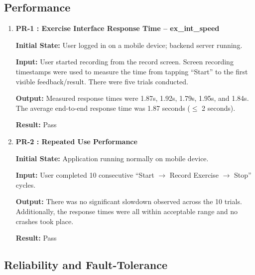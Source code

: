 \documentclass[12pt, titlepage]{article}
\begin{document}
\subsection{Performance}

\begin{enumerate}

\item \textbf{PR-1 : Exercise Interface Response Time -- ex\_int\_speed}

\textbf{Initial State:} User logged in on a mobile device; backend server running.

\textbf{Input:} User started recording from the record screen. Screen recording timestamps were 
used to measure the time from tapping ``Start'' to the first visible feedback/result. There were five trials conducted.

\textbf{Output:} Measured response times were 1.87s, 1.92s, 1.79s, 1.95s, and 1.84s. The average end-to-end 
response time was 1.87 seconds ($\leq$ 2 seconds).

\textbf{Result:} Pass

\vspace{0.5em}

\item \textbf{PR-2 : Repeated Use Performance}

\textbf{Initial State:} Application running normally on mobile device.

\textbf{Input:} User completed 10 consecutive ``Start $\rightarrow$ Record Exercise $\rightarrow$ Stop'' cycles.

\textbf{Output:} There was no significant slowdown observed across the 10 trials. Additionally, the response times were all within acceptable 
range and no crashes took place.

\textbf{Result:} Pass

\end{enumerate}

\subsection{Reliability and Fault-Tolerance}
\end{document}
